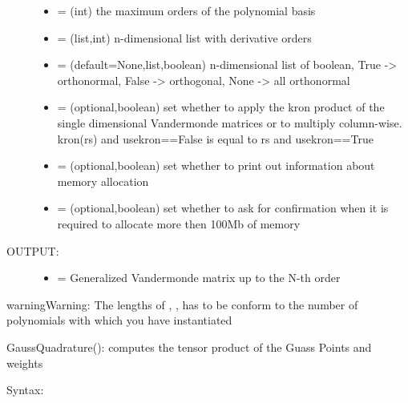 \documentclass[letterpaper,10pt,english]{sphinxmanual}
\begin{document}
\begin{fulllineitems}
\begin{fulllineitems}
\begin{description}
\begin{itemize}
\item {} 
 = (int) the maximum orders of the polynomial basis

\item {} 
 = (list,int) n-dimensional list with derivative orders

\item {} 
 = (default=None,list,boolean) n-dimensional list of boolean, True -\textgreater{} orthonormal, False -\textgreater{} orthogonal, None -\textgreater{} all orthonormal

\item {} 
 = (optional,boolean) set whether to apply the kron product of the single dimensional Vandermonde matrices or to multiply column-wise. kron(rs) and usekron==False is equal to rs and usekron==True

\item {} 
 = (optional,boolean) set whether to print out information about memory allocation

\item {} 
 = (optional,boolean) set whether to ask for confirmation when it is required to allocate more then 100Mb of memory

\end{itemize}

\item[{OUTPUT:}] \leavevmode\begin{itemize}
\item {} 
 = Generalized Vandermonde matrix up to the N-th order

\end{itemize}

\end{description}

\begin{notice}{warning}{Warning:}
The lengths of  ,  ,  has to be conform to the number of polynomials with which you have instantiated 
\end{notice}

\end{fulllineitems}


\begin{fulllineitems}
\label{index:SpectralToolbox.SpectralND.PolyND.Quadrature}
GaussQuadrature(): computes the tensor product of the Guass Points and weights
\begin{description}
\item[{Syntax:}] \leavevmode
{}


\end{description}
\end{fulllineitems}
\end{fulllineitems}
\end{document}
